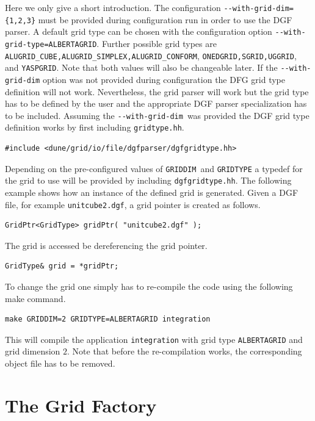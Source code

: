 \documentclass[11pt,a4paper,headinclude,footinclude,DIV16,normalheadings]{scrreprt}
\begin{document}
Here we only give a short introduction. The configuration
\lstinline!--with-grid-dim={1,2,3}! must be provided during configuration run
in order to use the DGF parser. A default grid type can be chosen with the
configuration option  \lstinline!--with-grid-type=ALBERTAGRID!.
Further possible grid types are \lstinline!ALUGRID_CUBE,ALUGRID_SIMPLEX,ALUGRID_CONFORM!, 
\lstinline!ONEDGRID,SGRID,UGGRID!, and \lstinline!YASPGRID!.
Note that both values will also be changeable later. 
If the \lstinline!--with-grid-dim! option was not provided during configuration the 
DFG grid type definition will not work. Nevertheless, the grid parser will work 
but the grid type has to be defined by the user and the appropriate DGF parser 
specialization has to be included. 
Assuming the \lstinline!--with-grid-dim!\ was provided the DGF grid type 
definition works by first including \lstinline!gridtype.hh!.
\begin{lstlisting}[basicstyle=\ttfamily\scriptsize]
#include <dune/grid/io/file/dgfparser/dgfgridtype.hh>
\end{lstlisting}
Depending on the pre-configured values of \lstinline!GRIDDIM!\ and
\lstinline!GRIDTYPE! a typedef for the grid to use will be provided by
including \lstinline!dgfgridtype.hh!. The following example shows how an 
instance of the defined grid is generated. Given a DGF file, for example 
\lstinline!unitcube2.dgf!, a grid pointer is created as follows.
\begin{lstlisting}[basicstyle=\ttfamily\scriptsize]
GridPtr<GridType> gridPtr( "unitcube2.dgf" );
\end{lstlisting}
The grid is accessed be dereferencing the grid pointer.
\begin{lstlisting}[basicstyle=\ttfamily\scriptsize]
GridType& grid = *gridPtr; 
\end{lstlisting}
To change the grid one simply has to re-compile the code using the following make command.
\begin{lstlisting}[basicstyle=\ttfamily\scriptsize]
make GRIDDIM=2 GRIDTYPE=ALBERTAGRID integration 
\end{lstlisting}
This will compile the application \texttt{integration} with grid type \lstinline!ALBERTAGRID! and grid dimension $2$.
Note that before the re-compilation works, 
the corresponding object file has to be removed.

\section{The Grid Factory}
\label{sec:grid_factory}
\end{document}
